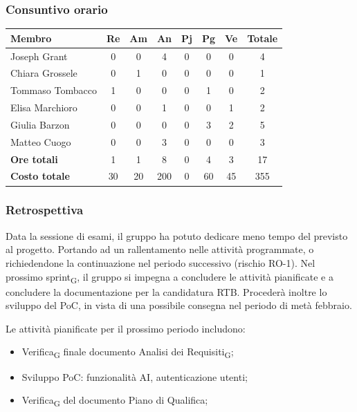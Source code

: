 \documentclass[11pt,a4paper]{article}
\newcommand{\gls}[1]{#1\textsubscript{G}}
\begin{document}
\subsubsection{Consuntivo orario}
\begin{center}
    \begin{tabular}{|l|c|c|c|c|c|c|c|}
        \hline
        \textbf{Membro} & \textbf{Re} & \textbf{Am} & \textbf{An} & \textbf{Pj} & \textbf{Pg} & \textbf{Ve} & \textbf{Totale} \\
        \hline
        Joseph Grant & 0 & 0 & 4 & 0 & 0 & 0 & 4 \\
        \hline
        Chiara Grossele & 0 & 1 & 0 & 0 & 0 & 0 & 1 \\
        \hline
        Tommaso Tombacco & 1 & 0 & 0 & 0 & 1 & 0 & 2 \\
        \hline
        Elisa Marchioro & 0 & 0 & 1 & 0 & 0 & 1 & 2 \\
        \hline
        Giulia Barzon & 0 & 0 & 0 & 0 & 3 & 2 & 5 \\
        \hline
        Matteo Cuogo & 0 & 0 & 3 & 0 & 0 & 0 & 3 \\
        \hline
        \textbf{Ore totali} & 1 & 1 & 8 & 0 & 4 & 3 & 17 \\
        \hline
        \textbf{Costo totale} & 30 & 20 & 200 & 0 & 60 & 45 & 355 \\
        \hline
    \end{tabular}
\end{center}

\subsubsection{Retrospettiva}
Data la sessione di esami, il gruppo ha potuto dedicare meno tempo del previsto al progetto. Portando ad un rallentamento nelle attività programmate, o richiedendone la continuazione nel periodo successivo (rischio RO-1). 
Nel prossimo \gls{sprint}, il gruppo si impegna a concludere le attività pianificate e a concludere la documentazione per la candidatura RTB. Procederà inoltre lo sviluppo del PoC, in vista di una possibile consegna nel periodo di metà febbraio.

Le attività pianificate per il prossimo periodo includono:
\begin{itemize}
    \item \gls{Verifica} finale documento \gls{Analisi dei Requisiti};
    \item Sviluppo PoC: funzionalità AI, autenticazione utenti;
    \item \gls{Verifica} del documento Piano di Qualifica;
\end{itemize}
\end{document}

